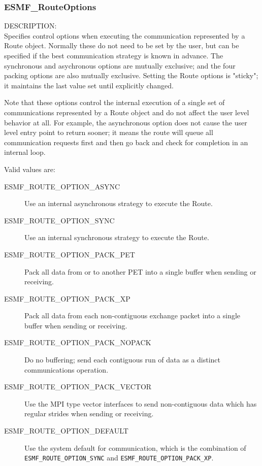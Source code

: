 
\subsubsection{ESMF\_RouteOptions}

\label{opt:routeopt}
{\sf DESCRIPTION:\\}
Specifies control options when executing the communication
represented by a Route object.  Normally these do not need to
be set by the user, but can be specified if the best communication strategy
is known in advance.   The synchronous and asychronous options 
are mutually exclusive; and the four packing options are also
mutually exclusive.  Setting the Route options is "sticky"; it
maintains the last value set until explicitly changed.

Note that these options control the internal execution of a single
set of communications represented by a Route object and do not affect
the user level behavior at all.  For example,
the asynchronous option does not cause the user level entry point to
return sooner; it means the route will queue all communication requests
first and then go back and check for completion in an internal loop.

Valid values are:
\begin{description}
    \item [ESMF\_ROUTE\_OPTION\_ASYNC]
	Use an internal asynchronous strategy to execute the Route.
    \item [ESMF\_ROUTE\_OPTION\_SYNC]
	Use an internal synchronous strategy to execute the Route.
    \item [ESMF\_ROUTE\_OPTION\_PACK\_PET]
        Pack all data from or to another PET into a single buffer
        when sending or receiving.
    \item [ESMF\_ROUTE\_OPTION\_PACK\_XP]
        Pack all data from each non-contiguous exchange packet 
        into a single buffer when sending or receiving.
    \item [ESMF\_ROUTE\_OPTION\_PACK\_NOPACK]
        Do no buffering; send each contiguous run of data as a distinct
        communications operation.
    \item [ESMF\_ROUTE\_OPTION\_PACK\_VECTOR]
        Use the MPI type vector interfaces to send non-contiguous data
        which has regular strides when sending or receiving.
    \item [ESMF\_ROUTE\_OPTION\_DEFAULT]
	Use the system default for communication, which is the
        combination of {\tt ESMF\_ROUTE\_OPTION\_SYNC} and
        {\tt ESMF\_ROUTE\_OPTION\_PACK\_XP}.
\end{description}







